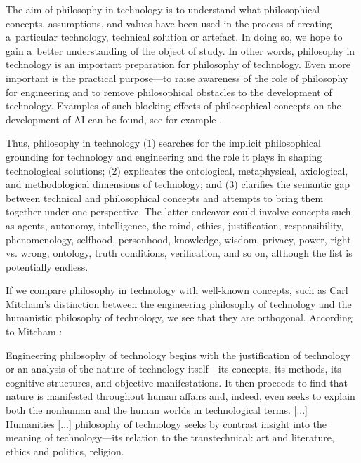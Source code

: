 The aim of philosophy in technology is to understand what philosophical concepts, assumptions, and values have been used in the process of creating a~particular technology, technical solution or artefact. In doing so, we hope to gain a~better understanding of the object of study. In other words, philosophy in technology is an important preparation for philosophy of technology. Even more important is the practical purpose---to raise awareness of the role of philosophy for engineering and to remove philosophical obstacles to the development of technology. Examples of such blocking effects of philosophical concepts on the development of AI can be found, see for example 
\parencites[][]{smith_promise_2019}[][]{krzanowski_road_2021}[][]{wooldridge_road_2021}.%




Thus, philosophy in technology (1) searches for the implicit philosophical grounding for technology and engineering and the role it plays in shaping technological solutions; (2) explicates the ontological, metaphysical, axiological, and methodological dimensions of technology; and (3) clarifies the semantic gap between technical and philosophical concepts and attempts to bring them together under one perspective. The latter endeavor could involve concepts such as agents, autonomy, intelligence, the mind, ethics, justification, responsibility, phenomenology, selfhood, personhood, knowledge, wisdom, privacy, power, right vs. wrong, ontology, truth conditions, verification, and so on, although the list is potentially endless.



If we compare philosophy in technology with well-known concepts, such as Carl Mitcham's distinction between the engineering philosophy of technology and the humanistic philosophy of technology, we see that they are orthogonal. According to Mitcham 
\parencite*[][p.62]{mitcham_thinking_1994}:%




Engineering philosophy of technology begins with the justification of technology or an analysis of the nature of technology itself---its concepts, its methods, its cognitive structures, and objective manifestations. It then proceeds to find that nature is manifested throughout human affairs and, indeed, even seeks to explain both the nonhuman and the human worlds in technological terms. [...] Humanities [...] philosophy of technology seeks by contrast insight into the meaning of technology---its relation to the transtechnical: art and literature, ethics and politics, religion.



